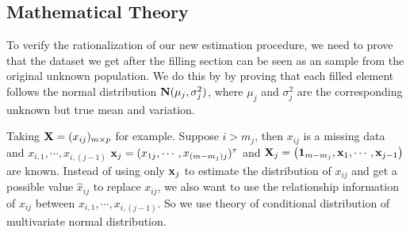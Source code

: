 \documentclass[a4,11pt,epsf, amssymb]{article}
\begin{document}
\subsection{Mathematical Theory}

To verify the rationalization of our new estimation procedure, we need to prove that the dataset we get after the filling section can be seen as an sample from the original unknown population. We do this by by proving that each filled element follows the normal distribution ${\bf N}(\mu_j, \sigma_j^2)$, where $\mu_j$ and $\sigma_j^2$ are the corresponding unknown but true mean and variation.
 
Taking ${\bf X}=(x_{ij})_{m\times p}$ for example. Suppose $i > m_j$, then $x_{ij}$ is a missing data and $x_{i,1}, \cdots, x_{i,(j-1)}$ $ {\bf x}_j= (x_{1j},\cdots,x_{(m-m_j)j})^\tau$ and
${\bf X}_j=\left({\bf1}_{m-m_j},{\bf x}_1,\cdots,{\bf x}_{j-1}\right)$ are known. Instead of using only ${\bf x}_j$ to estimate the distribution of $x_{ij}$ and get a possible value $\hat{x}_{ij}$ to replace $x_{ij}$, we also want to use the relationship information of $x_{ij}$ between $x_{i,1}, \cdots, x_{i,(j-1)}$.  So we use theory of conditional distribution of multivariate normal distribution. 
\end{document}
